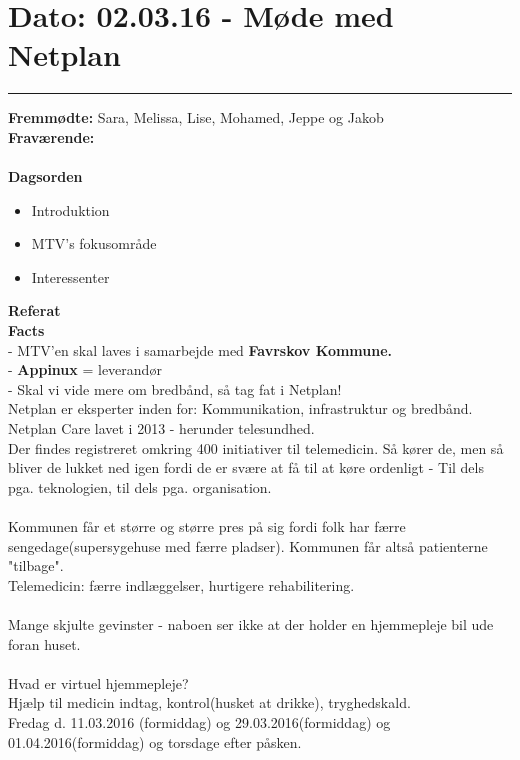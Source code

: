 

\section{Dato: 02.03.16 - Møde med Netplan}
\hrule

\textbf{Fremmødte:} Sara, Melissa, Lise, Mohamed, Jeppe og Jakob\\

\textbf{Fraværende:} 
\\
\\
\textbf{Dagsorden}
\begin{itemize}
	\item Introduktion
	\item MTV's fokusområde
	\item Interessenter
\end{itemize}

\textbf{Referat} 
\\
\textbf{Facts} 
\\
 - MTV'en skal laves i samarbejde med \textbf{Favrskov Kommune.}\\
 - \textbf{Appinux} = leverandør\\
 - Skal vi vide mere om bredbånd, så tag fat i Netplan!\\

Netplan er eksperter inden for:
Kommunikation, infrastruktur og bredbånd. \\
Netplan Care lavet i 2013 - herunder telesundhed.\\
Der findes registreret omkring 400 initiativer til telemedicin. Så kører de, men så bliver de lukket ned igen fordi de er svære at få til at køre ordenligt - Til dels pga. teknologien, til dels pga. organisation. \\\\
Kommunen får et større og større pres på sig fordi folk har færre sengedage(supersygehuse med færre pladser). Kommunen får altså patienterne "tilbage". \\
Telemedicin: færre indlæggelser, hurtigere rehabilitering.
\\\\
Mange skjulte gevinster - naboen ser ikke at der holder en hjemmepleje bil ude foran huset.\\\\
Hvad er virtuel hjemmepleje? \\
Hjælp til medicin indtag, kontrol(husket at drikke), tryghedskald.\\

Fredag d. 11.03.2016 (formiddag) og 29.03.2016(formiddag) og 01.04.2016(formiddag) og torsdage efter påsken.



